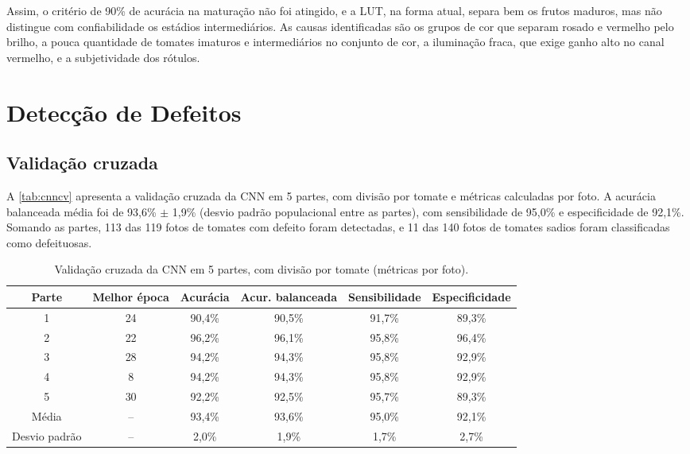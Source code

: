 Assim, o critério de 90\% de acurácia na maturação não foi atingido, e a LUT, na forma atual, separa bem os frutos maduros, mas não distingue com confiabilidade os estádios intermediários. As causas identificadas são os grupos de cor que separam rosado e vermelho pelo brilho, a pouca quantidade de tomates imaturos e intermediários no conjunto de cor, a iluminação fraca, que exige ganho alto no canal vermelho, e a subjetividade dos rótulos.

\section{Detecção de Defeitos}

\subsection{Validação cruzada}

A \autoref{tab:cnncv} apresenta a validação cruzada da CNN em 5 partes, com divisão por tomate e métricas calculadas por foto. A acurácia balanceada média foi de 93,6\% $\pm$ 1,9\% (desvio padrão populacional entre as partes), com sensibilidade de 95,0\% e especificidade de 92,1\%. Somando as partes, 113 das 119 fotos de tomates com defeito foram detectadas, e 11 das 140 fotos de tomates sadios foram classificadas como defeituosas.

\begin{table}[htb]
	\ABNTEXfontereduzida
	\centering
	\caption{\label{tab:cnncv}Validação cruzada da CNN em 5 partes, com divisão por tomate (métricas por foto).}
	\begin{tabular}{cccccc}
		\toprule
		Parte & Melhor época & Acurácia & Acur. balanceada & Sensibilidade & Especificidade \\
		\midrule
		1 & 24 & 90,4\% & 90,5\% & 91,7\% & 89,3\% \\
		2 & 22 & 96,2\% & 96,1\% & 95,8\% & 96,4\% \\
		3 & 28 & 94,2\% & 94,3\% & 95,8\% & 92,9\% \\
		4 & 8 & 94,2\% & 94,3\% & 95,8\% & 92,9\% \\
		5 & 30 & 92,2\% & 92,5\% & 95,7\% & 89,3\% \\
		\midrule
		Média & -- & 93,4\% & 93,6\% & 95,0\% & 92,1\% \\
		Desvio padrão & -- & 2,0\% & 1,9\% & 1,7\% & 2,7\% \\
		\bottomrule
	\end{tabular}
\end{table}

